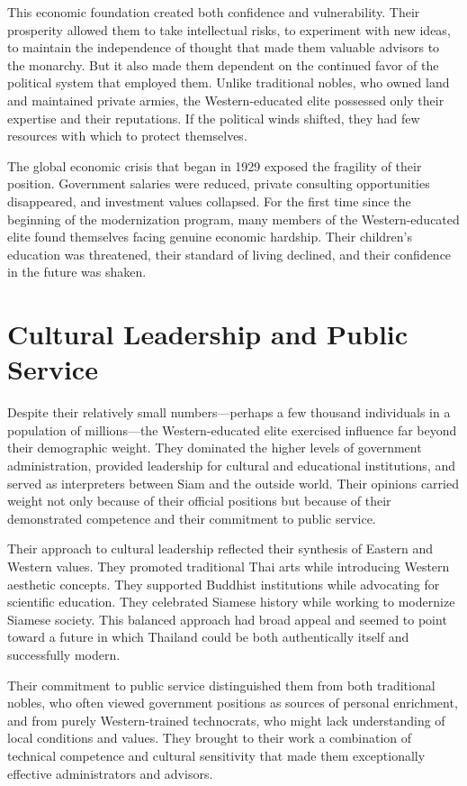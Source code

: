 \documentclass[
  Letterpaper,
]{scrbook}
\begin{document}
This economic foundation created both confidence and vulnerability.
Their prosperity allowed them to take intellectual risks, to experiment
with new ideas, to maintain the independence of thought that made them
valuable advisors to the monarchy. But it also made them dependent on
the continued favor of the political system that employed them. Unlike
traditional nobles, who owned land and maintained private armies, the
Western-educated elite possessed only their expertise and their
reputations. If the political winds shifted, they had few resources with
which to protect themselves.

The global economic crisis that began in 1929 exposed the fragility of
their position. Government salaries were reduced, private consulting
opportunities disappeared, and investment values collapsed. For the
first time since the beginning of the modernization program, many
members of the Western-educated elite found themselves facing genuine
economic hardship. Their children's education was threatened, their
standard of living declined, and their confidence in the future was
shaken.

\section{Cultural Leadership and Public
Service}\label{cultural-leadership-and-public-service}

Despite their relatively small numbers---perhaps a few thousand
individuals in a population of millions---the Western-educated elite
exercised influence far beyond their demographic weight. They dominated
the higher levels of government administration, provided leadership for
cultural and educational institutions, and served as interpreters
between Siam and the outside world. Their opinions carried weight not
only because of their official positions but because of their
demonstrated competence and their commitment to public service.

Their approach to cultural leadership reflected their synthesis of
Eastern and Western values. They promoted traditional Thai arts while
introducing Western aesthetic concepts. They supported Buddhist
institutions while advocating for scientific education. They celebrated
Siamese history while working to modernize Siamese society. This
balanced approach had broad appeal and seemed to point toward a future
in which Thailand could be both authentically itself and successfully
modern.

Their commitment to public service distinguished them from both
traditional nobles, who often viewed government positions as sources of
personal enrichment, and from purely Western-trained technocrats, who
might lack understanding of local conditions and values. They brought to
their work a combination of technical competence and cultural
sensitivity that made them exceptionally effective administrators and
advisors.
\end{document}

